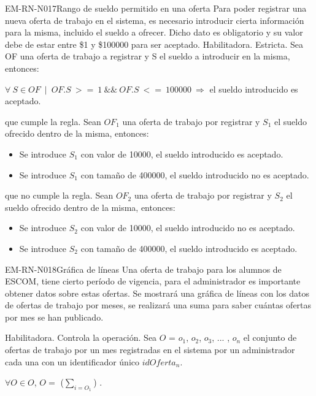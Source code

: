 \begin{BussinesRule}{EM-RN-N017}{Rango de sueldo permitido en una oferta}
	\BRitem[Descripción:] Para poder registrar una nueva oferta de trabajo en el sistema, es necesario introducir cierta información para la misma, incluido el sueldo a ofrecer. Dicho dato es obligatorio y su valor debe de estar entre \$1 y \$100000 para ser aceptado.
	\BRitem[Tipo: ] Habilitadora.
	\BRitem[Nivel: ] Estricta.
	\BRitem[Sentencia : ] Sea OF una oferta de trabajo a registrar y S el sueldo a introducir en la misma, entonces:
	\begin{center}
		$\forall \: S \in OF \: \mid \: OF.S \: >= \: 1 \: \&\& \: OF.S \: <= \: 100000 \: \Rightarrow$ el sueldo introducido es aceptado.
	\end{center}
	 que cumple la regla.
		Sean $OF_{1}$ una oferta de trabajo por registrar y $S_{1}$ el sueldo ofrecido dentro de la misma, entonces:
		\begin{itemize}
			\item Se introduce $S_{1}$ con valor de 10000, el sueldo introducido es aceptado.
			\item Se introduce $S_{1}$ con tamaño de 400000, el sueldo introducido no es aceptado.
		\end{itemize}
	 que no cumple la regla.
		Sean $OF_{2}$ una oferta de trabajo por registrar y $S_{2}$ el sueldo ofrecido dentro de la misma, entonces:
		\begin{itemize}
			\item Se introduce $S_{2}$ con valor de 10000, el sueldo introducido no es aceptado.
			\item Se introduce $S_{2}$ con tamaño de 400000, el sueldo introducido es aceptado.
		\end{itemize}
\end{BussinesRule}


\begin{BussinesRule}{EM-RN-N018}{Gráfica de líneas}
	\BRitem[Descripción:] 
	Una oferta de trabajo para los alumnos de ESCOM, tiene cierto período de vigencia, para el administrador es importante obtener datos sobre estas ofertas.
	Se mostrará una gráfica de líneas con los datos de ofertas de trabajo por meses, se realizará una suma para saber cuántas ofertas por mes se han publicado.
	
	\BRitem[Tipo:] Habilitadora.
	\BRitem[Nivel:] Controla la operación.
	\BRitem[Sentencia: ] Sea $O$ = {$o_{1}$, $o_{2}$, $o_{3}$, ... , $o_{n}$} el conjunto de ofertas de trabajo por un mes registradas en el sistema por un administrador cada una con un 
	identificador único $idOferta_{n}$.
	\begin{center}
		$\forall O \in O$, $O=$ {($ \sum_{i=O_1} $)} .
	\end{center}
\end{BussinesRule}